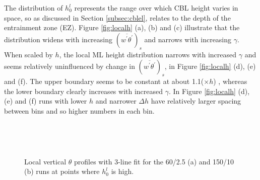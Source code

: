The distribution of $h_{0}^{l}$ represents the range over which \acs{CBL} height varies in space, so as 
discussed in Section \ref{subsec:cblel}, relates to the depth of the entrainment zone (\acs{EZ}).
Figure \ref{fig:localh} (a), (b) and (c) illustrate that the distribution widens with increasing $(\overline{w^{'}\theta^{'}})_{s}$ and narrows with increasing $\gamma$.  When scaled by $h$, the local \acs{ML} height distribution 
narrows with increased $\gamma$ and seems relatively uninfluenced by change in $(\overline{w^{'}\theta^{'}})_{s}$, in Figure \ref{fig:localh} (d), (e) and (f).  The upper boundary seems to be constant at about 1.1($\times h$) , whereas the lower boundary clearly increases 
with increased $\gamma$.   In Figure \ref{fig:localh} (d), (e) and (f) runs with lower $h$ and narrower $\Delta h$ have relatively 
larger spacing between bins and so higher numbers in each bin.\\

\begin{figure}[htbp]
\begin{minipage}[b]{0.5\linewidth}
        \\
        \end{minipage}             
\quad
\begin{minipage}[b]{0.5\linewidth}
        \\
       
       \end{minipage}
\caption[High local \acs{ML}]{Local vertical $\theta$ profiles with 3-line fit for the 60/2.5 (a) and 150/10 (b) runs at 
points where $h^{l}_{0}$ is high.}
        
        \label{fig:rssfitshigh}
\end{figure}

